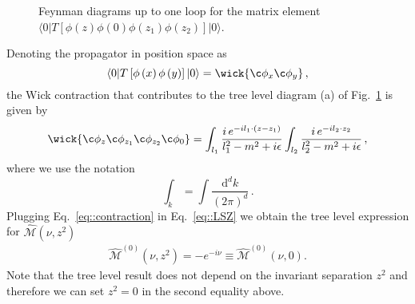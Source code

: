 \begin{figure}[h]
        \vspace*{5mm}
        \caption{Feynman diagrams up to one loop for the matrix element \\ 
        $\langle 0 | T\left[\phi\left(z\right)\phi\left(0\right)\phi\left(z_1\right)\phi\left(z_2\right)\right]|0\rangle $.}
        \label{fig:2}
\end{figure}
%
Denoting the propagator in position space as
\begin{equation}
        \langle 0 | T\left[\phi\left(x\right)\phi\left(y\right)\right]|0\rangle = \wick{\c \phi_x \c \phi_{y} }   \, ,     
\end{equation}
the Wick contraction that contributes to the tree level diagram (a) of Fig.~\ref{fig:2} is given by 
\begin{align}
\label{eq::contraction}
        \wick{\c \phi_z \c \phi_{z_1} \c \phi_{z_2} \c \phi_{0}}=
        \int_{l_1} \frac{i \, e^{-i l_1 \cdot \left(z-z_1\right)}}{l_1^2 -m^2 + i\epsilon} \int_{l_2} 
        \frac{i\,e^{-i l_2 \cdot z_2}}{l_2^2 -m^2 + i\epsilon}\, ,
\end{align}
where we use the notation
\begin{equation}
        \int_k = \int \frac{\mathrm{d}^dk}{(2\pi)^d}\, .
\end{equation}
Plugging Eq.~\eqref{eq::contraction} in Eq.~\eqref{eq::LSZ} we obtain the tree
level expression for $\widehat{\mathcal{M}}\left(\nu, z^2\right)$
\begin{align}
\label{eq::treelevel}
        \widehat{\mathcal{M}}^{(0)}\left(\nu, z^2\right) = - e^{-i \nu} \equiv \widehat{\mathcal{M}}^{(0)}\left(\nu, 0\right) .
\end{align}
Note that the tree level result does not depend on the invariant separation $z^2$ and therefore we can set $z^2=0$ in the second equality above.

